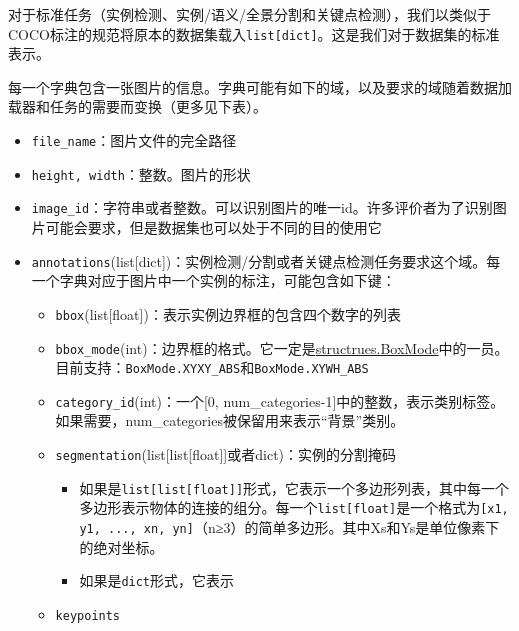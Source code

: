 \documentclass[../main.tex]{subfile}
\begin{document}
对于标准任务（实例检测、实例/语义/全景分割和关键点检测），我们以类似于COCO标注的规范将原本的数据集载入\lstinline{list[dict]}。这是我们对于数据集的标准表示。

每一个字典包含一张图片的信息。字典可能有如下的域，以及要求的域随着数据加载器和任务的需要而变换（更多见下表）。



\begin{itemize}
    \item \lstinline{file_name}：图片文件的完全路径
    \item \lstinline{height, width}：整数。图片的形状
    \item \lstinline{image_id}：字符串或者整数。可以识别图片的唯一id。许多评价者为了识别图片可能会要求，但是数据集也可以处于不同的目的使用它
    \item \lstinline{annotations}(list[dict])：实例检测/分割或者关键点检测任务要求这个域。每一个字典对应于图片中一个实例的标注，可能包含如下键：
          \begin{itemize}
              \item \lstinline{bbox}(list[float])：表示实例边界框的包含四个数字的列表
              \item \lstinline{bbox_mode}(int)：边界框的格式。它一定是\href{https://detectron2.readthedocs.io/en/latest/modules/structures.html#detectron2.structures.BoxMode}{structrues.BoxMode}中的一员。目前支持：\lstinline{BoxMode.XYXY_ABS}和\lstinline{BoxMode.XYWH_ABS}
              \item \lstinline{category_id}(int)：一个[0, num\_categories-1]中的整数，表示类别标签。如果需要，num\_categories被保留用来表示“背景”类别。
              \item \lstinline{segmentation}(list[list[float]]或者dict)：实例的分割掩码
                    \begin{itemize}
                        \item 如果是\lstinline{list[list[float]]}形式，它表示一个多边形列表，其中每一个多边形表示物体的连接的组分。每一个\lstinline{list[float]}是一个格式为\lstinline{[x1, y1, ..., xn, yn]}（n≥3）的简单多边形。其中Xs和Ys是单位像素下的绝对坐标。
                        \item 如果是\lstinline{dict}形式，它表示
                    \end{itemize}
              \item \lstinline{keypoints}

\end{itemize}
\end{itemize}
\end{document}
